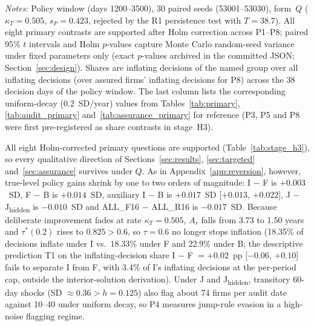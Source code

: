 \documentclass[11pt]{article}
\newcommand{\Jh}{J\textsubscript{hidden}}
\begin{document}
\begin{table}[h]
\begin{threeparttable}
\begin{tablenotes}[flushleft]\footnotesize
\item \textit{Notes:} Policy window (days 1200--3500), 30 paired seeds (53001--53030), form~$Q$ ($\kappa_T = 0.505$, $s_P = 0.423$, rejected by the R1 persistence test with $T = 38.7$). All eight primary contrasts are supported after Holm correction across P1--P8; paired 95\% $t$ intervals and Holm $p$-values capture Monte Carlo random-seed variance under fixed parameters only (exact $p$-values archived in the committed JSON; Section~\ref{sec:design}). Shares are inflating decisions of the named group over all inflating decisions (over assured firms' inflating decisions for P8) across the 38 decision days of the policy window. The last column lists the corresponding uniform-decay (0.2~SD/year) values from Tables~\ref{tab:primary}, \ref{tab:audit_primary} and~\ref{tab:assurance_primary} for reference (P3, P5 and P8 were first pre-registered as share contrasts in stage~H3).
\end{tablenotes}
\end{threeparttable}
\end{table}

All eight Holm-corrected primary questions are supported (Table~\ref{tab:stage_h3}), so every qualitative direction of Sections~\ref{sec:results}, \ref{sec:targeted} and~\ref{sec:assurance} survives under $Q$. As in Appendix~\ref{app:reversion}, however, true-level policy gains shrink by one to two orders of magnitude: I $-$ F is $+0.003$~SD, F $-$ B is $+0.014$~SD, auxiliary I $-$ B is $+0.017$~SD [$+0.013$, $+0.022$], J $-$ \Jh{} is $-0.010$~SD and ALL\_F16 $-$ ALL\_R16 is $-0.017$~SD. Because deliberate improvement fades at rate $\kappa_T = 0.505$, $A_r$ falls from 3.73 to 1.50 years and $\tau^*(0.2)$ rises to $0.825 > 0.6$, so $\tau = 0.6$ no longer stops inflation (18.35\% of decisions inflate under I vs.\ 18.33\% under F and 22.9\% under B; the descriptive prediction T1 on the inflating-decision share I $-$ F $= +0.02$~pp [$-0.06$, $+0.10$] fails to separate I from F, with 3.4\% of I's inflating decisions at the per-period cap, outside the interior-solution derivation). Under J and \Jh, transitory 60-day shocks (SD $\approx 0.36 > h = 0.125$) also flag about 74 firms per audit date against 10--40 under uniform decay, so P4 measures jump-rule evasion in a high-noise flagging regime.
\end{document}

